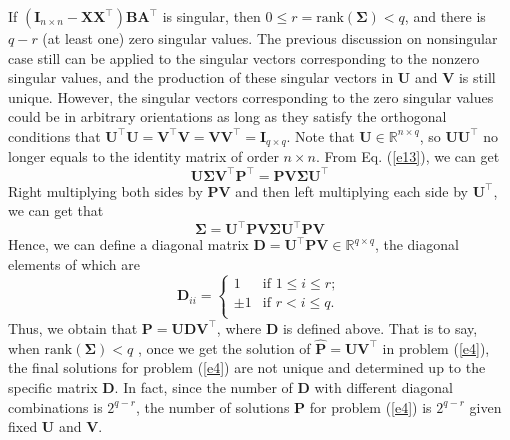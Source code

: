 \documentclass[titlepage,11pt,twoside]{article}
\begin{document}
If $(\mathbf{I}_{n\times n}-\mathbf{X}\mathbf{X}^{\top})\mathbf{B}\mathbf{A}^{\top}$ is singular, then $0\le r=\text{rank}(\mathbf{\Sigma})< q$, and there is $q-r$ (at least one) zero singular values. The previous discussion on nonsingular case still can be applied to the singular vectors corresponding to the nonzero singular values, and the production of these singular vectors in $\mathbf{U}$ and $\mathbf{V}$ is still unique. However, the singular vectors corresponding to the zero singular values could be in arbitrary orientations as long as they satisfy the orthogonal conditions that $\mathbf{U}^{\top}\mathbf{U}=\mathbf{V}^{\top}\mathbf{V}=\mathbf{V}\mathbf{V}^{\top}=\mathbf{I}_{q\times q}$. Note that $\mathbf{U}\in \mathbb{R}^{n\times q}$, so $\mathbf{U}\mathbf{U}^{\top}$ no longer equals to the identity matrix of order $n\times n$. From Eq. (\ref{e13}), we can get 
\begin{equation}
\mathbf{U}\mathbf{\Sigma}\mathbf{V}^{\top}\mathbf{P}^{\top}
=
\mathbf{P}\mathbf{V}\mathbf{\Sigma}\mathbf{U}^{\top}
\end{equation}
Right multiplying both sides by $\mathbf{P}\mathbf{V}$ and then left multiplying each side by $\mathbf{U}^{\top}$, we can get that 
\begin{equation}
\mathbf{\Sigma}
=
\mathbf{U}^{\top}\mathbf{P}\mathbf{V}\mathbf{\Sigma}\mathbf{U}^{\top}\mathbf{P}\mathbf{V}
\end{equation}
Hence, we can define a diagonal matrix $\mathbf{D}=\mathbf{U}^{\top}\mathbf{P}\mathbf{V}\in\mathbb{R}^{q\times q}$, the diagonal elements of which are 
\begin{displaymath}
\mathbf{D}_{ii}= \left\{ \begin{array}{ll}
1 & \textrm{if $1\le i\le r$};\\
\pm 1 & \textrm{if $r< i \le q$}.\\
\end{array} \right.
\end{displaymath}
Thus, we obtain that $\mathbf{P}=\mathbf{U}\mathbf{D}\mathbf{V}^{\top}$, where $\mathbf{D}$ is defined above. That is to say, when $\text{rank}(\mathbf{\Sigma})<q$ , once we get the solution of $\mathbf{\hat{P}}=\mathbf{U}\mathbf{V}^{\top}$ in problem (\ref{e4}), the final solutions for problem (\ref{e4}) are not unique and determined up to the specific matrix $\mathbf{D}$. In fact, since the number of $\mathbf{D}$ with different diagonal combinations is $2^{q-r}$, the number of solutions $\mathbf{P}$ for problem (\ref{e4}) is $2^{q-r}$ given fixed $\mathbf{U}$ and $\mathbf{V}$.
\end{document}
